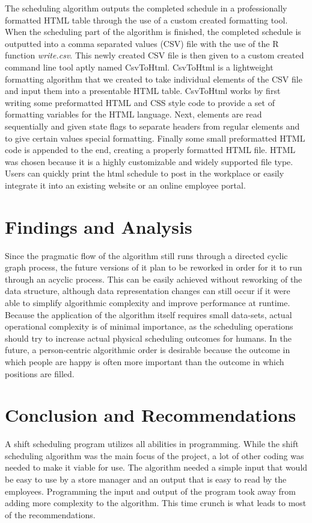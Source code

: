 \documentclass[a4paper,11pt]{article}
\begin{document}
The scheduling algorithm outputs the completed schedule in a professionally formatted HTML table through the use of a custom created formatting tool. When the scheduling part of the algorithm is finished, the completed schedule is outputted into a comma separated values (CSV) file with the use of the R function \textit{write.csv}. This newly created CSV file is then given to a custom created command line tool aptly named CsvToHtml. CsvToHtml is a lightweight formatting algorithm that we created to take individual elements of the CSV file and input them into a presentable HTML table. CsvToHtml works by first writing some preformatted HTML and CSS style code to provide a set of formatting variables for the HTML language. Next, elements are read sequentially and given state flags to separate headers from regular elements and to give certain values special formatting. Finally some small preformatted HTML code is appended to the end, creating a properly formatted HTML file. HTML was chosen because it is a highly customizable and widely supported file type. Users can quickly print the html schedule to post in the workplace or easily integrate it into an existing website or an online employee portal.
 
\section{Findings and Analysis}

Since the pragmatic flow of the algorithm still runs through a directed cyclic graph process, the future versions of it plan to be reworked in order for it to run through an acyclic process. This can be easily achieved without reworking of the data structure, although data representation changes can still occur if it were able to simplify algorithmic complexity and improve performance at runtime. Because the application of the algorithm itself requires small data-sets, actual operational complexity is of minimal importance, as the scheduling operations should try to increase actual physical scheduling outcomes for humans. In the future, a person-centric algorithmic order is desirable because the outcome in which people are happy is often more important than the outcome in which positions are filled.

\section{Conclusion and Recommendations}
A shift scheduling program utilizes all abilities in programming. While the shift scheduling algorithm was the main focus of the project, a lot of other coding was needed to make it viable for use. The algorithm needed a simple input that would be easy to use by a store manager and an output that is easy to read by the employees. Programming the input and output of the program took away from adding more complexity to the algorithm. This time crunch is what leads to most of the recommendations. 
\end{document}
